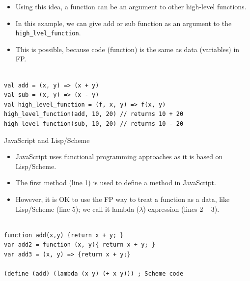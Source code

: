 \begin{frame}[fragile]{}

\begin{itemize}
	\item Using this idea, a function can be an argument to other high-level functions. 
	\item In this example, we can give add or sub function as an argument to the \verb|high_lvel_function|. 
	\item This is possible, because code (function) is the same as data (variables) in FP. 
\end{itemize}

\begin{Code}{}%
\begin{lstlisting}[firstnumber=1, label=glabels, xleftmargin=0pt, basicstyle=\scriptsize]% 

val add = (x, y) => (x + y)
val sub = (x, y) => (x - y)
val high_level_function = (f, x, y) => f(x, y)
high_level_function(add, 10, 20) // returns 10 + 20
high_level_function(sub, 10, 20) // returns 10 - 20 
\end{lstlisting}%
\end{Code}%

\end{frame}

\begin{frame}[fragile]{JavaScript and Lisp/Scheme}

\begin{itemize}
	\item JavaScript uses functional programming approaches as it is based on Lisp/Scheme.
	\item The first method (line 1) is used to define a method in JavaScript.
	\item However, it is OK to use the FP way to treat a function as a data, like Lisp/Scheme (line 5); we call it lambda ($\lambda$) expression (lines 2 -- 3). 
\end{itemize}

\begin{Code}{}%
\begin{lstlisting}[firstnumber=1, label=glabels, xleftmargin=0pt, basicstyle=\scriptsize]% 

function add(x,y) {return x + y; }
var add2 = function (x, y){ return x + y; }
var add3 = (x, y) => {return x + y;}

(define (add) (lambda (x y) (+ x y))) ; Scheme code 
\end{lstlisting}%
\end{Code}%
\end{frame}

